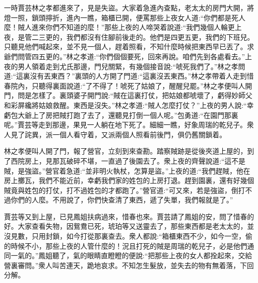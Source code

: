 \begin{parag}
    一時賈芸林之孝都進來了，見是失盜。大家着急進內查點，老太太的房門大開，將燈一照，鎖頭擰折，進內一瞧，箱櫃已開，便罵那些上夜女人道:“你們都是死人麼！賊人進來你們不知道的麼！”那些上夜的人啼哭着說道:“我們幾個人輪更上夜，是管二三更的，我們都沒有住腳前後走的。他們是四更五更，我們的下班兒。只聽見他們喊起來，並不見一個人，趕着照看，不知什麼時候把東西早已丟了。求爺們問管四五更的。”林之孝道:“你們個個要死，回來再說。咱們先到各處看去。”上夜的男人領着走到尤氏那邊，門兒關緊，有幾個接音說:“唬死我們了。”林之孝問道:“這裏沒有丟東西？”裏頭的人方開了門道:“這裏沒丟東西。”林之孝帶着人走到惜春院內，只聽得裏面說道:“了不得了！唬死了姑娘了，醒醒兒罷。”林之孝便叫人開門，問是怎樣了。裏頭婆子開門說:“賊在這裏打仗，把姑娘都唬壞了，虧得妙師父和彩屏纔將姑娘救醒。東西是沒失。”林之孝道:“賊人怎麼打仗？”上夜的男人說:“幸虧包大爺上了房把賊打跑了去了，還聽見打倒一個人呢。”包勇道:“在園門那裏呢。”賈芸等走到那邊，果見一人躺在地下死了。細細一瞧，好象周瑞的乾兒子。衆人見了詫異，派一個人看守着，又派兩個人照看前後門，俱仍舊關鎖着。
\end{parag}


\begin{parag}
    林之孝便叫人開了門，報了營官，立刻到來查勘。踏察賊跡是從後夾道上屋的，到了西院房上，見那瓦破碎不堪，一直過了後園去了。衆上夜的齊聲說道:“這不是賊，是強盜。”營官着急道:“並非明火執杖，怎算是盜。”上夜的道:“我們趕賊，他在房上擲瓦，我們不能近前，幸虧我們家的姓包的上房打退。趕到園裏，還有好幾個賊竟與姓包的打仗，打不過姓包的才都跑了。”營官道:“可又來，若是強盜，倒打不過你們的人麼。不用說了，你們快查清了東西，遞了失單，我們報就是了。”
\end{parag}


\begin{parag}
    賈芸等又到上屋，已見鳳姐扶病過來，惜春也來。賈芸請了鳳姐的安，問了惜春的好。大家查看失物，因鴛鴦已死，琥珀等又送靈去了，那些東西都是老太太的，並沒見數，只用封鎖，如今打從那裏查去。衆人都說:“箱櫃東西不少，如今一空，偷的時候不小，那些上夜的人管什麼的！況且打死的賊是周瑞的乾兒子，必是他們通同一氣的。”鳳姐聽了，氣的眼睛直瞪瞪的便說:“把那些上夜的女人都拴起來，交給營裏審問。”衆人叫苦連天，跪地哀求。不知怎生髮放，並失去的物有無着落，下回分解。
\end{parag}